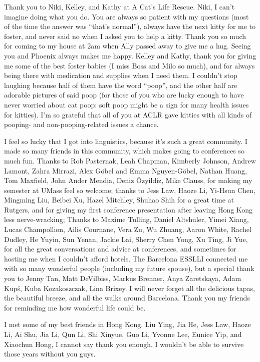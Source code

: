Thank you to Niki, Kelley, and Kathy at A Cat’s Life Rescue. Niki, I can’t imagine doing what you do. You are always so patient with my questions (most of the time the answer was “that’s normal”), always have the next kitty for me to foster, and never said no when I asked you to help a kitty. Thank you so much for coming to my house at 2am when Ally passed away to give me a hug. Seeing you and Phoenix always makes me happy. Kelley and Kathy, thank you for giving me some of the best foster babies (I miss Boss and Milo so much), and for always being there with medication and supplies when I need them. I couldn’t stop laughing because half of them have the word ``poop”, and the other half are adorable pictures of said poop (for those of you who are lucky enough to have never worried about cat poop: soft poop might be a sign for many health issues for kitties). I’m so grateful that all of you at ACLR gave kitties with all kinds of pooping- and non-pooping-related issues a chance.
 
I feel so lucky that I got into linguistics, because it’s such a great community. I made so many friends in this community, which makes going to conferences so much fun. Thanks to Rob Pasternak, Leah Chapman, Kimberly Johnson, Andrew Lamont, Zahra Mirrazi, Alex Göbel and Emma Nguyen-Göbel, Nathan Huang, Tom Maxfield, John Ander Mendia, Deniz Özyildiz, Mike Clauss, for making my semester at UMass feel so welcome; thanks to Jess Law, Haoze Li, Yi-Hsun Chen, Mingming Liu, Beibei Xu, Hazel Mitchley, Shuhao Shih for a great time at Rutgers, and for giving my first conference presentation after leaving Hong Kong less nerve-wracking; Thanks to Maxime Tulling, Daniel Altshuler, Yimei Xiang, Lucas Champollion, Ailis Cournane, Vera Zu, Wu Zhuang, Aaron White, Rachel Dudley, He Yuyin, Sun Yenan, Jackie Lai, Sherry Chen Yong, Xu Ting, Ji Yue, for all the great conversations and advice at conferences, and sometimes for hosting me when I couldn’t afford hotels. The Barcelona ESSLLI connected me with so many wonderful people (including my future spouse), but a special thank you to Jenny Tan, Matt DeVilbiss, Markus Brenner, Anya Zaretskaya, Adam Kupś, Kuba Kozakoszczak, Lina Brixey. I will never forget all the delicious tapas, the beautiful breeze, and all the walks around Barcelona. Thank you my friends for reminding me how wonderful life could be.

 
I met some of my best friends in Hong Kong. Liu Ying, Jia He, Jess Law, Haoze Li, Ai Shu, Jia Li, Qun Li, Shi Xinyue, Guo Li, Yvonne Lee, Eunice Yip, and Xiaochun Hong, I cannot say thank you enough. I wouldn’t be able to survive those years without you guys.
 
